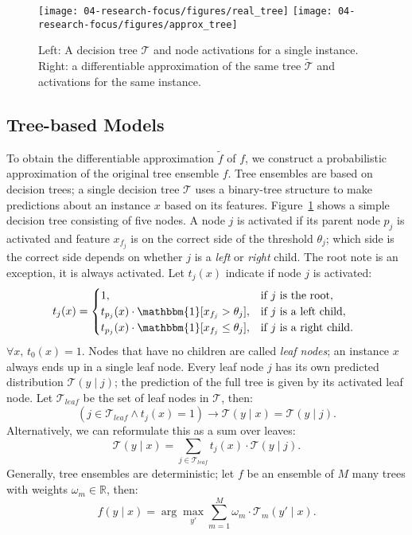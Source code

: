 \begin{figure}[t]
\centering
\texttt{[image: 04-research-focus/figures/real\_tree]} 
\quad
\texttt{[image: 04-research-focus/figures/approx\_tree]}
\vspace{2mm}
\caption{
Left: A decision tree $\mathcal{T}$ and node activations for a single instance. Right: a differentiable approximation of the same tree $\widetilde{\mathcal{T}}$ and activations for the same instance.
}
\label{fig:exampletrees}
\end{figure}


\subsection{Tree-based Models}
To obtain the differentiable approximation $\tilde{f}$ of $f$, we construct a probabilistic approximation of the original tree ensemble $f$.
Tree ensembles are based on decision trees; a single decision tree $\mathcal{T}$ uses a binary-tree structure to make predictions about an instance $x$ based on its features.
Figure~\ref{fig:exampletrees} shows a simple decision tree consisting of five nodes.
A node $j$ is activated if its parent node $p_j$ is activated and feature $x_{f_j}$ is on the correct side of the threshold $\theta_j$; which side is the correct side depends on whether $j$ is a \emph{left} or \emph{right} child. 
The root note is an exception, it is always activated.
Let $t_j(x)$ indicate if node $j$ is activated:
\begin{equation}
\mbox{}\hspace*{-2mm}t_j(x) =
    \begin{cases}
   1, & \text{if $j$ is the root}, \\
   t_{p_j}(x) \cdot  \mathbbm{1}[x_{f_j} > \theta_j], & \text{if $j$ is a left child}, \\
    t_{p_j}(x) \cdot  \mathbbm{1}[x_{f_j} \leq \theta_j], &\text{if $j$ is a right child}.
    \end{cases}
\end{equation}
$\forall x, \,  t_0(x) = 1$.
Nodes that have no children are called \emph{leaf nodes}; an instance $x$ always ends up in a single leaf node.
Every leaf node $j$ has its own predicted distribution $\mathcal{T}(y \mid j)$; the prediction of the full tree is given by its activated leaf node. 
Let $\mathcal{T}_{\textit{leaf}}$ be the set of leaf nodes in $\mathcal{T}$, then:
\begin{equation}
(j \in \mathcal{T}_{\textit{leaf}} \land t_j(x) = 1) \rightarrow \mathcal{T}(y \mid x) = \mathcal{T}(y \mid j).
\end{equation}
Alternatively, we can reformulate this as a sum over leaves:
\begin{equation}
\mathcal{T}(y \mid x) = \sum_{j \in \mathcal{T}_\mathit{leaf}}  t_j(x) \cdot \mathcal{T}(y \mid j).
\end{equation}
Generally, tree ensembles are deterministic; let $f$ be an ensemble of $M$ many trees with weights $\omega_m \in \mathbb{R}$, then:
\begin{equation}
f(y \mid x)
=  \arg\max_{y'} \sum_{m=1}^M \omega_m \cdot \mathcal{T}_m(y' \mid x).
\end{equation}


